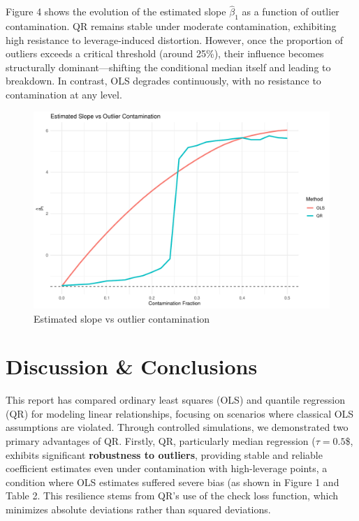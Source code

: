 \documentclass[fleqn,10pt]{latex/stylish_article} %
\begin{document}
Figure 4 shows the evolution of the estimated slope \(\hat{\beta}_1\) as a function of outlier contamination. QR remains stable under moderate contamination, exhibiting high resistance to leverage-induced distortion. However, once the proportion of outliers exceeds a critical threshold (around 25\%), their influence becomes structurally dominant---shifting the conditional median itself and leading to breakdown. In contrast, OLS degrades continuously, with no resistance to contamination at any level.

\begin{figure}

{\centering \includegraphics[width=0.8\linewidth]{ADR_project_draft_files/figure-latex/unnamed-chunk-6-1} 

}

\caption{Estimated slope vs outlier contamination}\label{fig:unnamed-chunk-6}
\end{figure}

\section{Discussion \& Conclusions}\label{discussion-conclusions}

This report has compared ordinary least squares (OLS) and quantile regression (QR) for modeling linear relationships, focusing on scenarios where classical OLS assumptions are violated. Through controlled simulations, we demonstrated two primary advantages of QR. Firstly, QR, particularly median regression (\(\tau=0.5\)\$, exhibits significant \textbf{robustness to outliers}, providing stable and reliable coefficient estimates even under contamination with high-leverage points, a condition where OLS estimates suffered severe bias (as shown in Figure 1 and Table 2. This resilience stems from QR's use of the check loss function, which minimizes absolute deviations rather than squared deviations.
\end{document}
